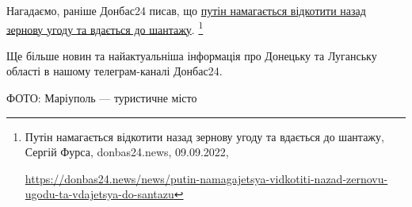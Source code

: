 Нагадаємо, раніше Донбас24 писав, що \href{https://donbas24.news/news/putin-namagajetsya-vidkotiti-nazad-zernovu-ugodu-ta-vdajetsya-do-santazu}{путін намагається відкотити назад зернову
угоду та вдається до шантажу}.%
\footnote{Путін намагається відкотити назад зернову угоду та вдається до шантажу, Сергій Фурса, donbas24.news, 09.09.2022, \par\url{https://donbas24.news/news/putin-namagajetsya-vidkotiti-nazad-zernovu-ugodu-ta-vdajetsya-do-santazu}}

Ще більше новин та найактуальніша інформація про Донецьку та Луганську області
в нашому телеграм-каналі Донбас24.

ФОТО: Маріуполь — туристичне місто

